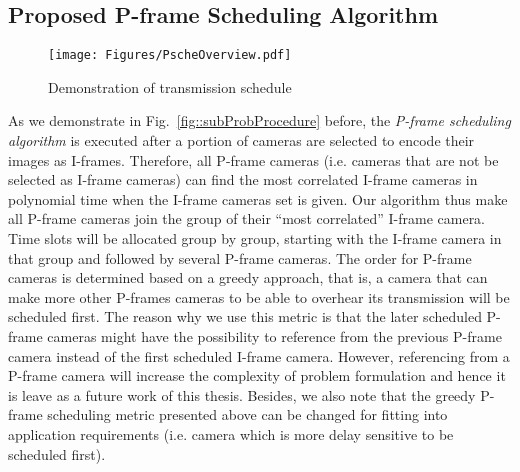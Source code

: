 \subsection{Proposed P-frame Scheduling Algorithm}
\label{sec::PFrameScheduling}
\begin{figure}
\begin{center}
\texttt{[image: Figures/PscheOverview.pdf]}
\caption{\label{fig::pScheOverview}Demonstration of transmission schedule}
\end{center}
\end{figure}
As we demonstrate in Fig.~\ref{fig::subProbProcedure} before, the \emph{P-frame scheduling algorithm} is executed after a portion of cameras are selected to encode their images as I-frames.
Therefore, all P-frame cameras (i.e. cameras that are not be selected as I-frame cameras) can find the most correlated I-frame cameras in polynomial time when the I-frame cameras set is given.
Our algorithm thus make all P-frame cameras join the group of their ``most correlated'' I-frame camera.
Time slots will be allocated group by group, starting with the I-frame camera in that group and followed by several P-frame cameras.
The order for P-frame cameras is determined based on a greedy approach, that is, a camera that can make more other P-frames cameras to be able to overhear its transmission will be scheduled first.
The reason why we use this metric is that the later scheduled P-frame cameras might have the possibility to reference from the previous P-frame camera instead of the first scheduled I-frame camera.
However, referencing from a P-frame camera will increase the complexity of problem formulation and hence it is leave as a future work of this thesis.
Besides, we also note that the greedy P-frame scheduling metric presented above can be changed for fitting into application requirements (i.e. camera which is more delay sensitive to be scheduled first).

